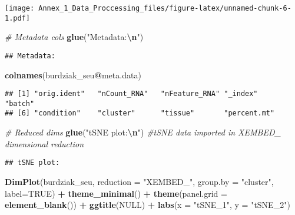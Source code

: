 \documentclass[
]{article}
\newenvironment{Shaded}{\begin{snugshade}}{\end{snugshade}}
\newcommand{\AttributeTok}[1]{\textcolor[rgb]{0.13,0.29,0.53}{#1}}
\newcommand{\CommentTok}[1]{\textcolor[rgb]{0.56,0.35,0.01}{\textit{#1}}}
\newcommand{\ConstantTok}[1]{\textcolor[rgb]{0.56,0.35,0.01}{#1}}
\newcommand{\FunctionTok}[1]{\textcolor[rgb]{0.13,0.29,0.53}{\textbf{#1}}}
\newcommand{\NormalTok}[1]{#1}
\newcommand{\SpecialCharTok}[1]{\textcolor[rgb]{0.81,0.36,0.00}{\textbf{#1}}}
\newcommand{\StringTok}[1]{\textcolor[rgb]{0.31,0.60,0.02}{#1}}
\begin{document}
\texttt{[image: Annex\_1\_Data\_Proccessing\_files/figure-latex/unnamed-chunk-6-1.pdf]}

\begin{Shaded}
\begin{Highlighting}[]
\CommentTok{\# Metadata cols}
\FunctionTok{glue}\NormalTok{(}\StringTok{"Metadata:}\SpecialCharTok{\textbackslash{}n}\StringTok{"}\NormalTok{)}
\end{Highlighting}
\end{Shaded}

\begin{verbatim}
## Metadata:
\end{verbatim}

\begin{Shaded}
\begin{Highlighting}[]
\FunctionTok{colnames}\NormalTok{(burdziak\_seu}\SpecialCharTok{@}\NormalTok{meta.data)}
\end{Highlighting}
\end{Shaded}

\begin{verbatim}
## [1] "orig.ident"   "nCount_RNA"   "nFeature_RNA" "_index"       "batch"       
## [6] "condition"    "cluster"      "tissue"       "percent.mt"
\end{verbatim}

\begin{Shaded}
\begin{Highlighting}[]
\CommentTok{\# Reduced dims}
\FunctionTok{glue}\NormalTok{(}\StringTok{"tSNE plot:}\SpecialCharTok{\textbackslash{}n}\StringTok{"}\NormalTok{) }\CommentTok{\#tSNE data imported in XEMBED\_ dimensional reduction}
\end{Highlighting}
\end{Shaded}

\begin{verbatim}
## tSNE plot:
\end{verbatim}

\begin{Shaded}
\begin{Highlighting}[]
\FunctionTok{DimPlot}\NormalTok{(burdziak\_seu, }\AttributeTok{reduction =} \StringTok{"XEMBED\_"}\NormalTok{, }\AttributeTok{group.by =} \StringTok{"cluster"}\NormalTok{, }\AttributeTok{label=}\ConstantTok{TRUE}\NormalTok{) }\SpecialCharTok{+} \FunctionTok{theme\_minimal}\NormalTok{() }\SpecialCharTok{+} \FunctionTok{theme}\NormalTok{(}\AttributeTok{panel.grid =} \FunctionTok{element\_blank}\NormalTok{()) }\SpecialCharTok{+} \FunctionTok{ggtitle}\NormalTok{(}\ConstantTok{NULL}\NormalTok{) }\SpecialCharTok{+} \FunctionTok{labs}\NormalTok{(}\AttributeTok{x =} \StringTok{"tSNE\_1"}\NormalTok{, }\AttributeTok{y =} \StringTok{"tSNE\_2"}\NormalTok{) }
\end{Highlighting}
\end{Shaded}
\end{document}
